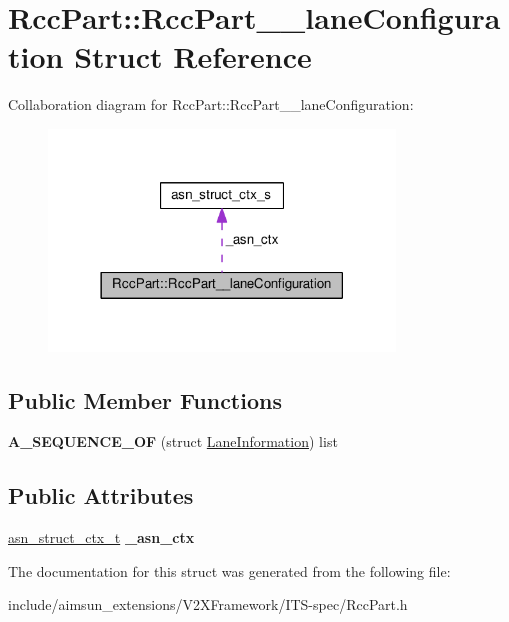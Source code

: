 \hypertarget{structRccPart_1_1RccPart____laneConfiguration}{}\section{Rcc\+Part\+:\+:Rcc\+Part\+\_\+\+\_\+lane\+Configuration Struct Reference}
\label{structRccPart_1_1RccPart____laneConfiguration}


Collaboration diagram for Rcc\+Part\+:\+:Rcc\+Part\+\_\+\+\_\+lane\+Configuration\+:\nopagebreak
\begin{figure}[H]
\begin{center}
\leavevmode
\includegraphics[width=261pt]{structRccPart_1_1RccPart____laneConfiguration__coll__graph}
\end{center}
\end{figure}
\subsection*{Public Member Functions}
\begin{DoxyCompactItemize}
\item 
{\bfseries A\+\_\+\+S\+E\+Q\+U\+E\+N\+C\+E\+\_\+\+OF} (struct \hyperlink{structLaneInformation}{Lane\+Information}) list\hypertarget{structRccPart_1_1RccPart____laneConfiguration_a0ce004d06a8d3006603557ae75d5fd70}{}\label{structRccPart_1_1RccPart____laneConfiguration_a0ce004d06a8d3006603557ae75d5fd70}

\end{DoxyCompactItemize}
\subsection*{Public Attributes}
\begin{DoxyCompactItemize}
\item 
\hyperlink{structasn__struct__ctx__s}{asn\+\_\+struct\+\_\+ctx\+\_\+t} {\bfseries \+\_\+asn\+\_\+ctx}\hypertarget{structRccPart_1_1RccPart____laneConfiguration_ab86e939f9e9d783e8072229c5734cbf8}{}\label{structRccPart_1_1RccPart____laneConfiguration_ab86e939f9e9d783e8072229c5734cbf8}

\end{DoxyCompactItemize}


The documentation for this struct was generated from the following file\+:\begin{DoxyCompactItemize}
\item 
include/aimsun\+\_\+extensions/\+V2\+X\+Framework/\+I\+T\+S-\/spec/Rcc\+Part.\+h\end{DoxyCompactItemize}
